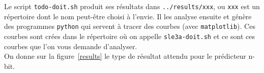 \documentclass[a4paper]{article}
\begin{document}
Le script \verb+todo-doit.sh+ produit ses résultats dans \verb+../results/xxx+, ou \verb+xxx+ est un répertoire dont le nom peut-être choisi à l'envie.
Il les analyse ensuite et génère des programmes \texttt{python} qui servent à tracer des courbes (avec \texttt{matplotlib}). Ces courbes sont crées dans le répertoire où on appelle \verb+sle3a-doit.sh+ et ce sont ces courbes que l'on vous demande d'analyser. \\

On donne sur la figure~\ref{results} le type de résultat attendu pour le prédicteur n-bit.

      \begin{figure}[h]
      \centering
\end{figure}
\end{document}
